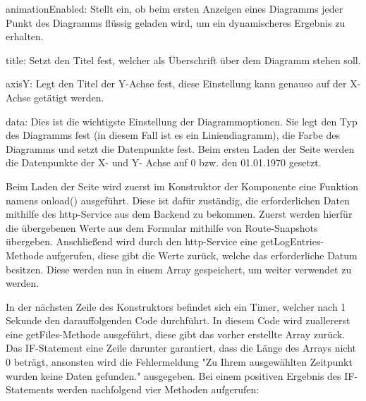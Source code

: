 \begin{compactitem}
    \item animationEnabled: Stellt ein, ob beim ersten Anzeigen eines Diagramms jeder Punkt des Diagramms flüssig geladen wird, um ein dynamischeres Ergebnis zu erhalten.   
    \item title: Setzt den Titel fest, welcher als Überschrift über dem Diagramm stehen soll.         
    \item axisY: Legt den Titel der Y-Achse fest, diese Einstellung kann genauso auf der X-Achse getätigt werden.   
    \item data: Dies ist die wichtigste Einstellung der Diagrammoptionen. Sie legt den Typ des Diagramms fest (in diesem Fall ist es ein Liniendiagramm), die Farbe des Diagramms und setzt die Datenpunkte fest. Beim ersten Laden der Seite werden die Datenpunkte der X- und Y- Achse auf 0 bzw. den 01.01.1970 gesetzt.
\end{compactitem}
 
Beim Laden der Seite wird zuerst im Konstruktor der Komponente eine Funktion namens onload() ausgeführt. Diese ist dafür zuständig, die erforderlichen Daten mithilfe des http-Service aus dem Backend zu bekommen. Zuerst werden hierfür die übergebenen Werte aus dem Formular mithilfe von Route-Snapshots übergeben. Anschließend wird durch den http-Service eine getLogEntries-Methode aufgerufen, diese gibt die Werte zurück, welche das erforderliche Datum besitzen. Diese werden nun in einem Array gespeichert, um weiter verwendet zu werden.
 
In der nächsten Zeile des Konstruktors befindet sich ein Timer, welcher nach 1 Sekunde den darauffolgenden Code durchführt. In diesem Code wird zuallererst eine getFiles-Methode ausgeführt, diese gibt das vorher erstellte Array zurück. Das IF-Statement eine Zeile darunter garantiert, dass die Länge des Arrays nicht 0 beträgt, ansonsten wird die Fehlermeldung "Zu Ihrem ausgewählten Zeitpunkt wurden keine Daten gefunden." ausgegeben. Bei einem positiven Ergebnis des IF-Statements werden nachfolgend vier Methoden aufgerufen:
 
